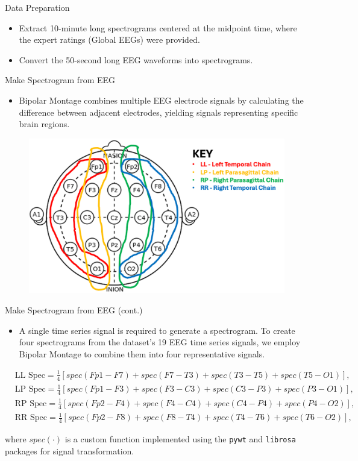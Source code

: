 \documentclass[leqno]{beamer}
\newcommand\pkg[1]{\texttt{#1}}
\begin{document}
\begin{frame}{Data Preparation}
\begin{itemize}
\item Extract 10-minute long spectrograms centered at the midpoint time,
where the expert ratings (Global EEGs) were provided.
\bigskip
\item Convert the 50-second long EEG waveforms into spectrograms.
\end{itemize}
\end{frame}


\begin{frame}{Make Spectrogram from EEG}
\begin{itemize}
\item Bipolar Montage combines multiple EEG electrode signals by calculating
the difference between adjacent electrodes, yielding signals representing
specific brain regions.
\end{itemize}
\begin{figure}[tbp]
\centering
\includegraphics[width=.7\textwidth]{inion}
\end{figure}
\end{frame}


\begin{frame}{Make Spectrogram from EEG (cont.)}
\begin{itemize} 
\item A single time series signal is required to generate a spectrogram.
To create four spectrograms from the dataset's 19 EEG time series signals,
we employ Bipolar Montage to combine them into four representative signals.
\end{itemize}
\begin{footnotesize}
\begin{align*}
& \text{LL Spec} = \frac{1}{4} \left[
spec(Fp1-F7) + spec(F7-T3) + spec(T3-T5) + spec(T5-O1) \right], \\
& \text{LP Spec} = \frac{1}{4} \left[
spec(Fp1-F3) + spec(F3-C3) + spec(C3-P3) + spec(P3-O1) \right], \\
& \text{RP Spec} = \frac{1}{4} \left[
spec(Fp2-F4) + spec(F4-C4) + spec(C4-P4) + spec(P4-O2) \right], \\
& \text{RR Spec} = \frac{1}{4} \left[
spec(Fp2-F8) + spec(F8-T4) + spec(T4-T6) + spec(T6-O2) \right],
\end{align*}
\end{footnotesize}
where $spec(\cdot)$ is a custom function implemented using the \pkg{pywt} and
\pkg{librosa} packages for signal transformation.
\end{frame}
\end{document}
